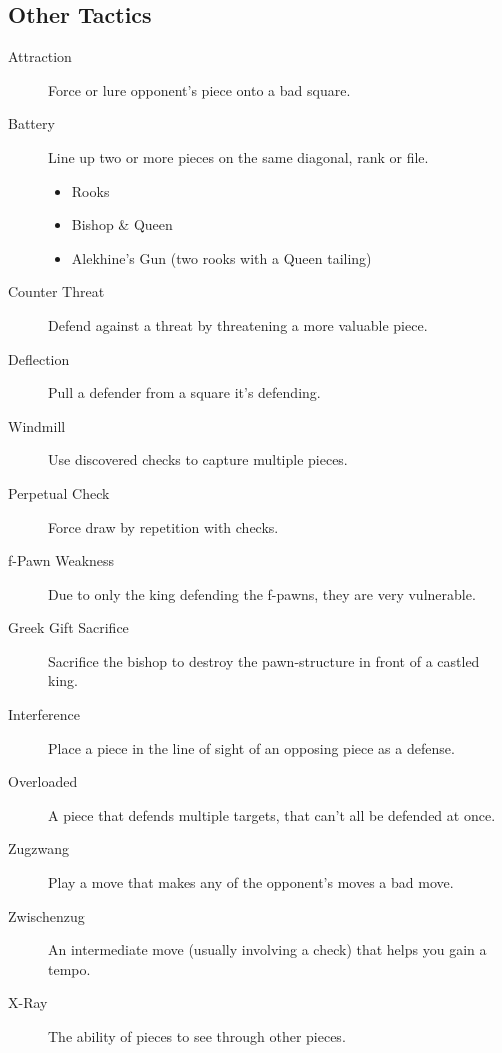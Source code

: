 \subsection{Other Tactics}

\begin{description}
  \item[Attraction] Force or lure opponent's piece onto a bad square.
  \item[Battery] Line up two or more pieces on the same diagonal, rank or file.
  \begin{itemize}
    \item Rooks
    \item Bishop \& Queen
    \item Alekhine's Gun (two rooks with a Queen tailing)
  \end{itemize}
  \item[Counter Threat] Defend against a threat by threatening a more valuable piece.
  \item[Deflection] Pull a defender from a square it's defending.
  \item[Windmill] Use discovered checks to capture multiple pieces.
  \item[Perpetual Check] Force draw by repetition with checks.
  \item[f-Pawn Weakness] Due to only the king defending the f-pawns, they are very vulnerable.
  \item[Greek Gift Sacrifice] Sacrifice the bishop to destroy the pawn-structure in front of a castled king.
  \item[Interference] Place a piece in the line of sight of an opposing piece as a defense.
  \item[Overloaded] A piece that defends multiple targets, that can't all be defended at once.
  \item[Zugzwang] Play a move that makes any of the opponent's moves a bad move.
  \item[Zwischenzug] An intermediate move (usually involving a check) that helps you gain a tempo.
  \item[X-Ray] The ability of pieces to see through other pieces.
\end{description}
